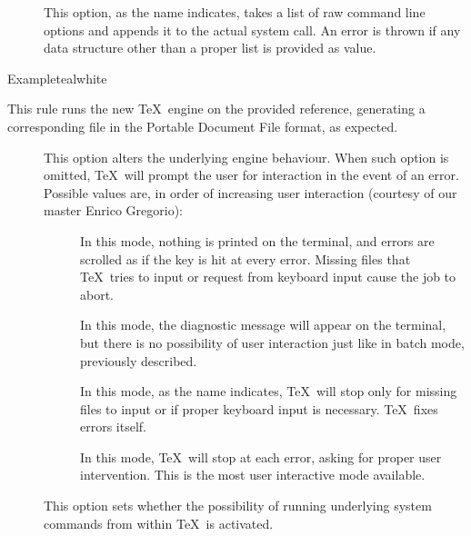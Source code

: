 \begin{description}
\begin{description}
\item[] This option, as the name indicates, takes a list of raw command line options and appends it to the actual system call. An error is thrown if any data structure other than a proper list is provided as value.
\end{description}

\begin{codebox}{Example}{teal}{\icnote}{white}
\end{codebox}

\item[\rulebox{xelatex}{Marco Daniel, Paulo Cereda}] This rule runs the new  \TeX\ engine on the provided  reference, generating a corresponding file in the Portable Document File format, as expected.

\begin{description}
\item[] This option alters the underlying engine behaviour. When such option is omitted, \TeX\ will prompt the user for interaction in the event of an error. Possible values are, in order of increasing user interaction (courtesy of our master Enrico Gregorio):

\begin{description}
\item[] In this mode, nothing is printed on the terminal, and errors are scrolled as if the  key is hit at every error. Missing files that \TeX\ tries to input or request from keyboard input cause the job to abort.

\item[] In this mode, the diagnostic message will appear on the terminal, but there is no possibility of user interaction just like in batch mode, previously described.

\item[] In this mode, as the name indicates, \TeX\ will stop only for missing files to input or if proper keyboard input is necessary. \TeX\ fixes errors itself.

\item[] In this mode, \TeX\ will stop at each error, asking for proper user intervention. This is the most user interactive mode available.
\end{description}

\item[] This option sets whether the possibility of running underlying system commands from within \TeX\ is activated.


\end{description}
\end{description}
